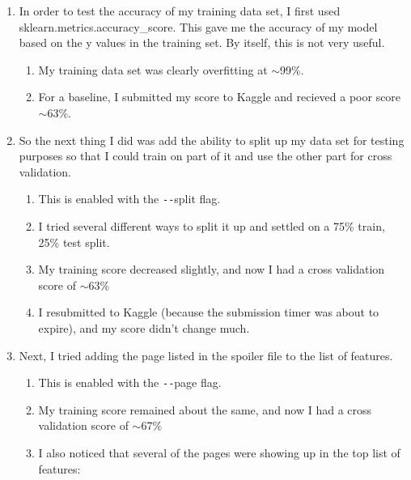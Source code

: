 \documentclass[8pt]{extarticle}
\begin{document}

\begin{enumerate}
  \item In order to test the accuracy of my training data set, I first used sklearn.metrics.accuracy\_score.  This gave me the accuracy of my model based on the y values in the training set.  By itself, this is not very useful.
  \begin{enumerate}
    \item My training data set was clearly overfitting at $\sim$99\%.
    \item For a baseline, I submitted my score to Kaggle and recieved a poor score $\sim$63\%.
  \end{enumerate}
  \item So the next thing I did was add the ability to split up my data set for testing purposes so that I could train on part of it and use the other part for cross validation.
  \begin{enumerate}
    \item This is enabled with the \texttt{-{}-}split flag.
    \item I tried several different ways to split it up and settled on a 75\% train, 25\% test split.
    \item My training score decreased slightly, and now I had a cross validation score of $\sim$63\%
    \item I resubmitted to Kaggle (because the submission timer was about to expire), and my score didn't change much.
  \end{enumerate}  
  \item Next, I tried adding the page listed in the spoiler file to the list of features.
  \begin{enumerate}
    \item This is enabled with the \texttt{-{}-}page flag.
    \item My training score remained about the same, and now I had a cross validation score of $\sim$67\%
    \item I also noticed that several of the pages were showing up in the top list of features:\\

\end{enumerate}
\end{enumerate}
\end{document}
